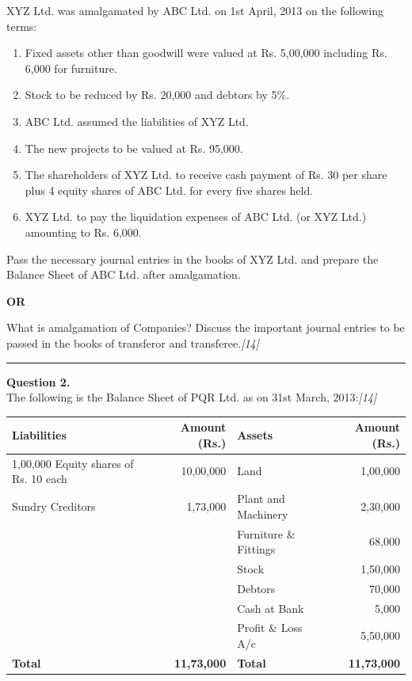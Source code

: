 \documentclass[11pt,a4paper]{article}
\newcommand{\pts}[1]{\hfill   \textit{[#1]}}
\begin{document}
XYZ Ltd. was amalgamated by ABC Ltd. on 1st April, 2013 on the following terms:

\begin{enumerate}[label=(\roman*),itemsep=2pt,topsep=2pt]
  \item Fixed assets other than goodwill were valued at Rs. 5,00,000 including Rs. 6,000 for furniture.
  \item Stock to be reduced by Rs. 20,000 and debtors by 5\%.
  \item ABC Ltd. assumed the liabilities of XYZ Ltd.
  \item The new projects to be valued at Rs. 95,000.
  \item The shareholders of XYZ Ltd. to receive cash payment of Rs. 30 per share plus 4 equity shares of ABC Ltd. for every five shares held.
  \item XYZ Ltd. to pay the liquidation expenses of ABC Ltd. (or XYZ Ltd.) amounting to Rs. 6,000.
\end{enumerate}
Pass the necessary journal entries in the books of XYZ Ltd. and prepare the Balance Sheet of ABC Ltd. after amalgamation.

\centerline{   \textbf{OR}}

What is amalgamation of Companies? Discuss the important journal entries to be passed in the books of transferor and transferee.\pts{14}

\medskip\rule{\linewidth}{0.2pt}

\pagebreak




\noindent   \textbf{Question 2.} \\
The following is the Balance Sheet of PQR Ltd. as on 31st March, 2013:\pts{14}

\begin{center}
\small
\renewcommand{\arraystretch}{1.2}

\begin{tabular}{|l|r|l|r|}
\hline
   \textbf{Liabilities} &   \textbf{Amount (Rs.)} &   \textbf{Assets} &   \textbf{Amount (Rs.)} \\ \hline
1,00,000 Equity shares of Rs. 10 each & 10,00,000 & Land & 1,00,000 \\
Sundry Creditors & 1,73,000 & Plant and Machinery & 2,30,000 \\
& & Furniture \& Fittings & 68,000 \\
& & Stock & 1,50,000 \\
& & Debtors & 70,000 \\
& & Cash at Bank & 5,000 \\
& & Profit \& Loss A/c & 5,50,000 \\ \hline
   \textbf{Total} &   \textbf{11,73,000} &   \textbf{Total} &   \textbf{11,73,000} \\ \hline
\end{tabular}
\end{center}
\end{document}
